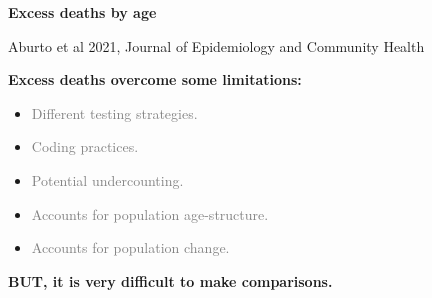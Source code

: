 \documentclass[xcolor={dvipsnames}]{beamer}
\begin{document}
\begin{frame}
	\begin{center}
		\LARGE{\textbf{Excess deaths by age}}			
		

	\end{center}

\tiny{Aburto et al 2021, Journal of Epidemiology and Community Health}
		
\end{frame}



\begin{frame}
	\begin{center}
		\LARGE{\textbf{Excess deaths overcome some limitations:}\linebreak 
		
		\begin{itemize}
			\item \textcolor{gray}{Different testing strategies.}
			\item \textcolor{gray}{Coding practices.}
			\item \textcolor{gray}{Potential undercounting.}
			\item \textcolor{gray}{Accounts for population age-structure.}
			\item \textcolor{gray}{Accounts for population change.} \linebreak
		\end{itemize} 
		
		\pause
		
		\textbf{BUT, it is very difficult to make comparisons.}
		
		}
	\end{center}
\end{frame}
\end{document}
